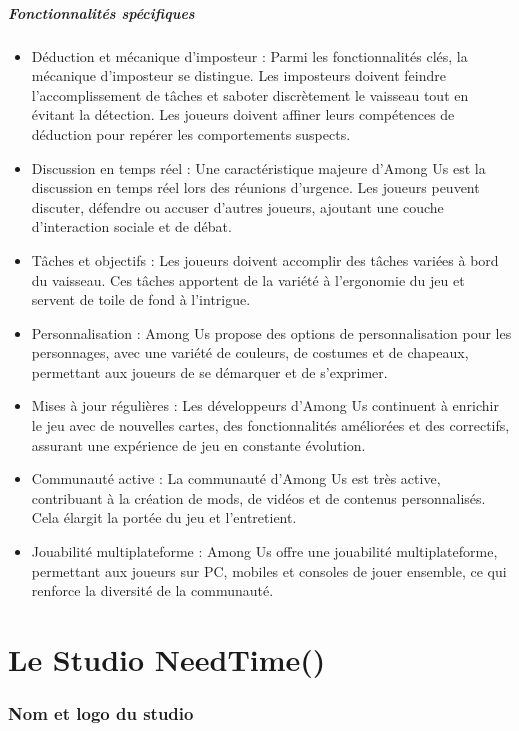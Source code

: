 \documentclass[
	article,			%
	11pt,				%
	oneside,			%
	a4paper,			%
	chapter=TITLE,
	french,			%
	sumario=tradicional
	]{base_nt}
\begin{document}
\newpage
\subsubsection{Fonctionnalités spécifiques}

\begin{itemize}
    \item Déduction et mécanique d'imposteur : Parmi les fonctionnalités clés, la mécanique d'imposteur se distingue. Les imposteurs doivent feindre l'accomplissement de tâches et saboter discrètement le vaisseau tout en évitant la détection. Les joueurs doivent affiner leurs compétences de déduction pour repérer les comportements suspects.
    \item Discussion en temps réel : Une caractéristique majeure d'Among Us est la discussion en temps réel lors des réunions d'urgence. Les joueurs peuvent discuter, défendre ou accuser d'autres joueurs, ajoutant une couche d'interaction sociale et de débat.
    \item Tâches et objectifs : Les joueurs doivent accomplir des tâches variées à bord du vaisseau. Ces tâches apportent de la variété à l'ergonomie du jeu et servent de toile de fond à l'intrigue.
    \item Personnalisation : Among Us propose des options de personnalisation pour les personnages, avec une variété de couleurs, de costumes et de chapeaux, permettant aux joueurs de se démarquer et de s'exprimer.
    \item Mises à jour régulières : Les développeurs d'Among Us continuent à enrichir le jeu avec de nouvelles cartes, des fonctionnalités améliorées et des correctifs, assurant une expérience de jeu en constante évolution.
    \item Communauté active : La communauté d'Among Us est très active, contribuant à la création de mods, de vidéos et de contenus personnalisés. Cela élargit la portée du jeu et l'entretient.
    \item Jouabilité multiplateforme : Among Us offre une jouabilité multiplateforme, permettant aux joueurs sur PC, mobiles et consoles de jouer ensemble, ce qui renforce la diversité de la communauté.
\end{itemize}


\part{Le Studio NeedTime()}

\section{Nom et logo du studio}
\end{document}
